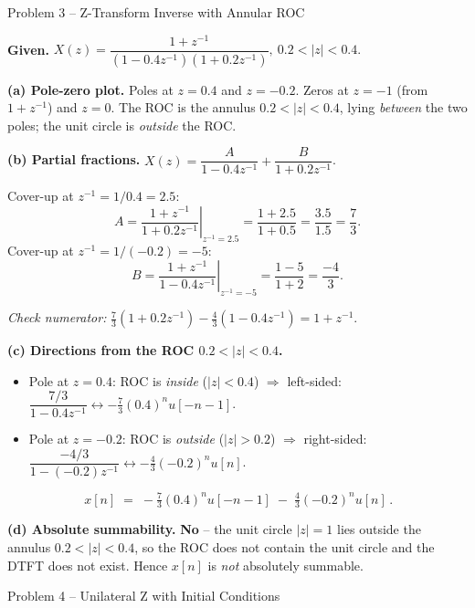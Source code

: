 \documentclass[11pt]{article}
\begin{document}
\vspace{10pt}

\begin{problembox}{Problem 3 -- Z-Transform Inverse with Annular ROC}
\end{problembox}

\textbf{Given.} $X(z) = \dfrac{1+z^{-1}}{(1-0.4z^{-1})(1+0.2z^{-1})},\ 0.2 < |z| < 0.4.$

\textbf{(a) Pole-zero plot.} Poles at $z=0.4$ and $z=-0.2$. Zeros at $z=-1$ (from $1+z^{-1}$) and $z=0$. The ROC is the annulus $0.2<|z|<0.4$, lying \emph{between} the two poles; the unit circle is \emph{outside} the ROC.

\textbf{(b) Partial fractions.} $X(z) = \dfrac{A}{1-0.4z^{-1}} + \dfrac{B}{1+0.2z^{-1}}$.

Cover-up at $z^{-1} = 1/0.4 = 2.5$:
\[
A = \left.\frac{1+z^{-1}}{1+0.2z^{-1}}\right|_{z^{-1}=2.5} = \frac{1+2.5}{1+0.5} = \frac{3.5}{1.5} = \frac{7}{3}.
\]
Cover-up at $z^{-1} = 1/(-0.2) = -5$:
\[
B = \left.\frac{1+z^{-1}}{1-0.4z^{-1}}\right|_{z^{-1}=-5} = \frac{1-5}{1+2} = \frac{-4}{3}.
\]

\textit{Check numerator:} $\tfrac{7}{3}(1+0.2z^{-1}) - \tfrac{4}{3}(1-0.4z^{-1}) = 1 + z^{-1}.$ \checkmark

\textbf{(c) Directions from the ROC $0.2<|z|<0.4$.}
\begin{itemize}[leftmargin=*, itemsep=0pt]
    \item Pole at $z=0.4$: ROC is \emph{inside} ($|z|<0.4$) $\Rightarrow$ left-sided:\quad $\dfrac{7/3}{1-0.4z^{-1}}\leftrightarrow -\tfrac{7}{3}(0.4)^n u[-n-1]$.
    \item Pole at $z=-0.2$: ROC is \emph{outside} ($|z|>0.2$) $\Rightarrow$ right-sided:\quad $\dfrac{-4/3}{1-(-0.2)z^{-1}}\leftrightarrow -\tfrac{4}{3}(-0.2)^n u[n]$.
\end{itemize}
\[
\boxed{\,x[n] \;=\; -\tfrac{7}{3}(0.4)^n u[-n-1]\;-\;\tfrac{4}{3}(-0.2)^n u[n]\,.}
\]

\textbf{(d) Absolute summability.} \textbf{No} -- the unit circle $|z|=1$ lies outside the annulus $0.2<|z|<0.4$, so the ROC does not contain the unit circle and the DTFT does not exist. Hence $x[n]$ is \emph{not} absolutely summable.

\vspace{10pt}

\begin{problembox}{Problem 4 -- Unilateral Z with Initial Conditions}
\end{problembox}
\end{document}
